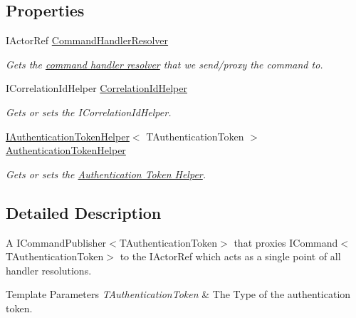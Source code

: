 \subsection*{Properties}
\begin{DoxyCompactItemize}
\item 
I\+Actor\+Ref \hyperlink{classCqrs_1_1Akka_1_1Commands_1_1AkkaCommandBusProxy_afab0340ffb172da48584dce148f3defd_afab0340ffb172da48584dce148f3defd}{Command\+Handler\+Resolver}
\begin{DoxyCompactList}\small\item\em Gets the \hyperlink{}{command handler resolver} that we send/proxy the command to. \end{DoxyCompactList}\item 
I\+Correlation\+Id\+Helper \hyperlink{classCqrs_1_1Akka_1_1Commands_1_1AkkaCommandBusProxy_aa554035c12060c7eedb0b982ac490da8_aa554035c12060c7eedb0b982ac490da8}{Correlation\+Id\+Helper}
\begin{DoxyCompactList}\small\item\em Gets or sets the I\+Correlation\+Id\+Helper. \end{DoxyCompactList}\item 
\hyperlink{interfaceCqrs_1_1Authentication_1_1IAuthenticationTokenHelper}{I\+Authentication\+Token\+Helper}$<$ T\+Authentication\+Token $>$ \hyperlink{classCqrs_1_1Akka_1_1Commands_1_1AkkaCommandBusProxy_a6faae6227f1da33928e54a775466f9c9_a6faae6227f1da33928e54a775466f9c9}{Authentication\+Token\+Helper}
\begin{DoxyCompactList}\small\item\em Gets or sets the \hyperlink{}{Authentication Token Helper}. \end{DoxyCompactList}\end{DoxyCompactItemize}


\subsection{Detailed Description}
A I\+Command\+Publisher$<$\+T\+Authentication\+Token$>$ that proxies I\+Command$<$\+T\+Authentication\+Token$>$ to the I\+Actor\+Ref which acts as a single point of all handler resolutions. 


\begin{DoxyTemplParams}{Template Parameters}
{\em T\+Authentication\+Token} & The Type of the authentication token.\\
\hline
\end{DoxyTemplParams}


